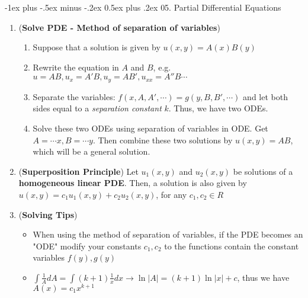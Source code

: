 \documentclass[10pt, landscape]{article}
\makeatletter
\renewcommand{\section}{\@startsection{section}{1}{0mm}%
                                {-1ex plus -.5ex minus -.2ex}%
                                {0.5ex plus .2ex}%
                                {\normalfont\large\bfseries}}
\makeatother
\begin{document}
\begin{multicols}{4}
\section{05. Partial Differential Equations}
\begin{enumerate}
    \item (\textbf{Solve PDE - Method of separation of variables})
    \begin{enumerate}
        \item Suppose that a solution is given by $u(x,y)=A(x)B(y)$
        \item Rewrite the equation in $A$ and $B$, e.g. $u=AB,u_x=A'B,u_y=AB',u_{xx}=A''B\cdots$
        \item Separate the variables: $f(x, A, A',\cdots)=g(y, B, B', \cdots)$ and let both sides equal to a \textit{separation constant} $k$. Thus, we have two ODEs.
        \item Solve these two ODEs using separation of variables in ODE. Get $A=\cdots x, B=\cdots y$. Then combine these two solutions by $u(x,y)=AB$, which will be a general solution.
    \end{enumerate}
    \item (\textbf{Superposition Principle}) Let $u_1(x,y)$ and $u_2(x,y)$ be solutions of a \textbf{homogeneous linear PDE}. Then, a solution is also given by $u(x,y)=c_1u_1(x,y)+c_2u_2(x,y)$, for any $c_1,c_2\in R$
    \item (\textbf{Solving Tips})
    \begin{itemize}
        \item When using the method of separation of variables, if the PDE becomes an "ODE" modify your constants $c_1,c_2$ to the functions contain the constant variables $f(y), g(y)$
        \item $\int\frac{1}{A}dA=\int(k+1)\frac{1}{x}dx\rightarrow \ln|A|=(k+1)\ln|x|+c$, thus we have $A(x)=c_1x^{k+1}$
    \end{itemize}
\end{enumerate}

\end{multicols}
\end{document}
